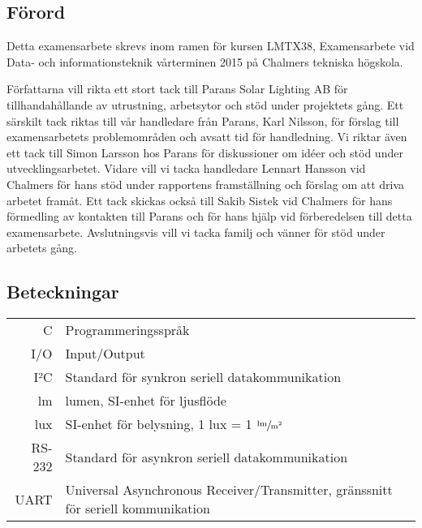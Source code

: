 \newpage
\subsection*{Förord} %
\label{sub:f_rord}
    Detta examensarbete skrevs inom ramen för kursen LMTX38, Examensarbete vid Data- och informationsteknik vårterminen 2015 på Chalmers tekniska högskola. \bigskip

    Författarna vill rikta ett stort tack till Parans Solar Lighting AB för tillhandahållande av utrustning, arbetsytor och stöd under projektets gång. Ett särskilt tack riktas till vår handledare från Parans, Karl Nilsson, för förslag till examensarbetets problemområden och avsatt tid för handledning. Vi riktar även ett tack till Simon Larsson hos Parans för diskussioner om idéer och stöd under utvecklingsarbetet. Vidare vill vi tacka handledare Lennart Hansson vid Chalmers för hans stöd under rapportens framställning och förslag om att driva arbetet framåt. Ett tack skickas också till Sakib Sistek vid Chalmers för hans förmedling av kontakten till Parans och för hans hjälp vid förberedelsen till detta examensarbete. Avslutningsvis vill vi tacka familj och vänner för stöd under arbetets gång.


\newpage

\subsection*{Beteckningar} %
\label{sub:beteckningar}
    \begin{tabularx}{\textwidth}{@{}rX}
        C & Programmeringsspråk \\
        I/O & Input/Output \\
        I²C & Standard för synkron seriell datakommunikation \\
        lm & lumen, SI-enhet för ljusflöde \\
        lux & SI-enhet för belysning, 1 lux = 1 $\sfrac{\text{lm}}{\text{m}^2}$ \\
        RS-232 & Standard för asynkron seriell datakommunikation \\
        UART & Universal Asynchronous Receiver/Transmitter, gränssnitt för seriell kommunikation
        
    \end{tabularx}
